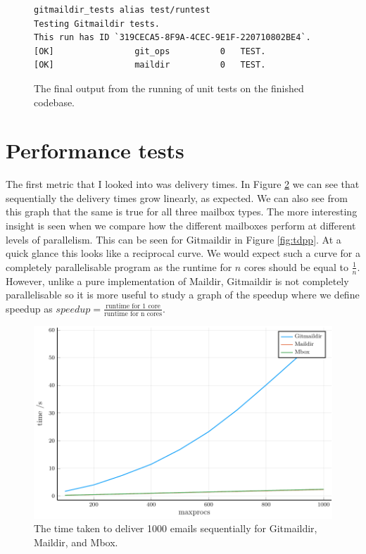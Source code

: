 \begin{figure}[h]
\centering
\begin{Verbatim}
gitmaildir_tests alias test/runtest
Testing Gitmaildir tests.
This run has ID `319CECA5-8F9A-4CEC-9E1F-220710802BE4`.
[OK]                git_ops          0   TEST.
[OK]                maildir          0   TEST.
\end{Verbatim}
\caption{The final output from the running of unit tests on the finished codebase.}
\label{fig:unittests}
\end{figure}

\section{Performance tests}

The first metric that I looked into was delivery times. In Figure \ref{fig:tds_combined} we can see that sequentially the delivery times grow linearly, as expected. We can also see from this graph that the same is true for all three mailbox types. The more interesting insight is seen when we compare how the different mailboxes perform at different levels of parallelism. This can be seen for Gitmaildir in Figure \ref{fig:tdpp}. At a quick glance this looks like a reciprocal curve. We would expect such a curve for a completely parallelisable program as the runtime for $n$ cores should be equal to $\frac{1}{n}$. However, unlike a pure implementation of Maildir, Gitmaildir is not completely parallelisable so it is more useful to study a graph of the speedup where we define speedup as $speedup = \frac{\textrm{runtime for 1 core}}{\textrm{runtime for n cores}}$.


\begin{figure}[h]
    \centering
    \includegraphics{figs/tds_combined}
    \caption{The time taken to deliver 1000 emails sequentially for Gitmaildir, Maildir, and Mbox.}
    \label{fig:tds_combined}
\end{figure}


